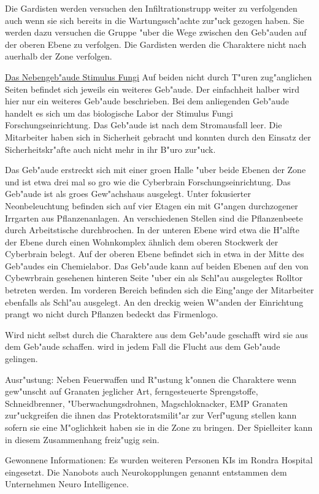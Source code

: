 Die Gardisten werden versuchen den Infiltrationstrupp weiter zu verfolgenden auch wenn sie sich bereits in die Wartungssch"achte zur"uck gezogen haben. Sie werden dazu versuchen die Gruppe "uber die Wege zwischen den Geb"auden auf der oberen Ebene zu verfolgen. Die Gardisten werden die Charaktere nicht nach au\3erhalb der Zone verfolgen.

\underline{Das Nebengeb"aude Stimulus Fungi} Auf beiden nicht durch T"uren zug"anglichen Seiten befindet sich jeweils ein weiteres Geb"aude. Der einfachheit halber wird hier nur ein weiteres Geb"aude beschrieben. Bei dem anliegenden Geb"aude handelt es sich um das biologische Labor der Stimulus Fungi Forschungseinrichtung. Das Geb"aude ist nach dem Stromausfall leer. Die Mitarbeiter haben sich in Sicherheit gebracht und konnten durch den Einsatz der Sicherheitskr"afte auch nicht mehr in ihr B"uro zur"uck. 

Das Geb"aude erstreckt sich mit einer gro\3en Halle "uber beide Ebenen der Zone und ist etwa drei mal so gro\3 wie die Cyberbrain Forschungseinrichtung. Das Geb"aude ist als gro\3es Gew"achshaus ausgelegt. Unter fokusierter Neonbeleuchtung befinden sich auf vier Etagen ein mit G"angen durchzogener Irrgarten aus Pflanzenanlagen. An verschiedenen Stellen sind die Pflanzenbeete durch Arbeitstische durchbrochen. In der unteren Ebene wird etwa die H"alfte der Ebene durch einen Wohnkomplex ähnlich dem oberen Stockwerk der Cyberbrain belegt. Auf der oberen Ebene befindet sich in etwa in der Mitte des Geb"audes ein Chemielabor. Das Geb"aude kann auf beiden Ebenen auf den von Cybewrbrain gesehenen hinteren Seite "uber ein als Schl"au\3 ausgelegtes Rolltor betreten werden. Im vorderen Bereich befinden sich die Eing"ange der Mitarbeiter ebenfalls als Schl"au\3 ausgelegt. An den dreckig wei\3en W"anden der Einrichtung prangt wo nicht durch Pflanzen bedeckt das Firmenlogo.

\underline{\ml{}} Wird \ml{} nicht selbst durch die Charaktere aus dem Geb"aude geschafft wird \xl{} sie aus dem Geb"aude schaffen. \ml{} wird in jedem Fall die Flucht aus dem Geb"aude gelingen.

\begin{remarks}
	Ausr"ustung: Neben Feuerwaffen und R"ustung k"onnen die Charaktere wenn gew"unscht auf Granaten jeglicher Art, ferngesteuerte Sprengstoffe, Schneidbrenner, "Uberwachungsdrohnen, Magschlo\3knacker, EMP Granaten zur"uckgreifen die ihnen das Protektoratsmilit"ar zur Verf"ugung stellen kann sofern sie eine M"oglichkeit haben sie in die Zone zu bringen. Der Spielleiter kann in diesem Zusammenhang freiz"ugig sein.

	Gewonnene Informationen:  Es wurden weiteren Personen KIs im Rondra Hospital eingesetzt. Die Nanobots auch Neurokopplungen genannt entstammen dem Unternehmen Neuro Intelligence. 
\end{remarks}


